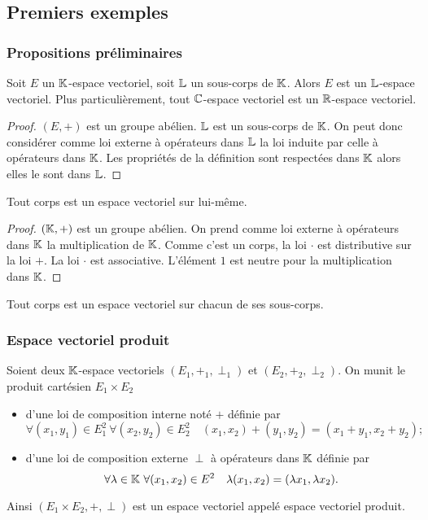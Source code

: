 \subsection{Premiers exemples}
\subsubsection{Propositions préliminaires}
\begin{prop}
  Soit \(E\) un \(\mathbb{K}\)-espace vectoriel, soit \(\mathbb{L}\) un sous-corps de \(\mathbb{K}\).
  Alors \(E\) est un \(\mathbb{L}\)-espace vectoriel. Plus particulièrement, tout
  \(\mathbb{C}\)-espace vectoriel est un \(\mathbb{R}\)-espace vectoriel.
\end{prop}
\begin{proof}
  \((E,+)\) est un groupe abélien. \(\mathbb{L}\) est un sous-corps de \(\mathbb{K}\). On peut
  donc considérer comme loi externe à opérateurs dans \(\mathbb{L}\) la loi induite par
  celle à opérateurs dans \(\mathbb{K}\). Les propriétés de la définition sont
  respectées dans \(\mathbb{K}\) alors elles le sont dans \(\mathbb{L}\).
\end{proof}
\begin{prop}
  Tout corps est un espace vectoriel sur lui-même.
\end{prop}
\begin{proof}
  \((\mathbb{K},+)\) est un groupe abélien. On prend comme loi externe à opérateurs dans
  \(\mathbb{K}\) la multiplication de \(\mathbb{K}\). Comme c'est un corps, la loi \(\cdot\) est
  distributive sur la loi \(+\). La loi \(\cdot\) est associative. L'élément
  \(1\) est neutre pour la multiplication dans \(\mathbb{K}\).
\end{proof}
\begin{cor}
  Tout corps est un espace vectoriel sur chacun de ses sous-corps.
\end{cor}

\subsubsection{Espace vectoriel produit}

Soient deux \(\mathbb{K}\)-espace vectoriels \((E_1,+_1,\perp_1)\) et
\((E_2,+_2,\perp_2)\). On munit le produit cartésien \(E_1 \times E_2\)
\begin{itemize}
  \item d'une loi de composition interne noté \(+\) définie par
    \begin{equation}
      \forall (x_1, y_1)\in E_1^2 \ \forall (x_2, y_2) \in E_2^2 \quad (x_1,x_2)
      + (y_1,y_2) = (x_1+y_1,x_2+y_2);
    \end{equation}
  \item d'une loi de composition externe \(\perp\) à opérateurs dans \(\mathbb{K}\)
    définie par
    \begin{equation}
      \forall \lambda \in \mathbb{K} \ \forall (x_1,x_2) \in E^2 \quad
      \lambda(x_1,x_2)=(\lambda x_1, \lambda x_2).
    \end{equation}
\end{itemize}
Ainsi \((E_1 \times E_2,+,\perp)\) est un espace vectoriel appelé espace
vectoriel produit.

